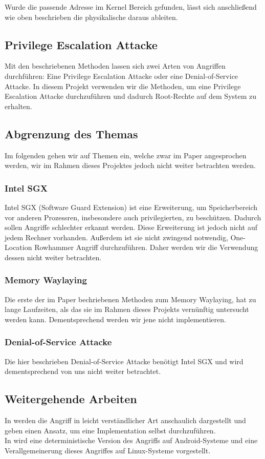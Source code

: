 \documentclass[conference]{IEEEtran}
\begin{document}
Wurde die passende Adresse im Kernel Bereich gefunden, lässt sich anschließend wie oben beschrieben die physikalische daraus ableiten. 



\subsection{Privilege Escalation Attacke}
Mit den beschriebenen Methoden lassen sich zwei Arten von Angriffen durchführen: Eine Privilege Escalation Attacke oder eine Denial-of-Service Attacke. In diesem Projekt verwenden wir die Methoden, um eine Privilege Escalation Attacke durchzuführen und dadurch Root-Rechte auf dem System zu erhalten.



\subsection{Abgrenzung des Themas}
Im folgenden gehen wir auf Themen ein, welche zwar im Paper angesprochen werden, wir im Rahmen dieses Projektes jedoch nicht weiter betrachten werden.
\subsubsection{Intel SGX}
Intel SGX (Software Guard Extension) ist eine Erweiterung, um Speicherbereich vor anderen Prozessren, insbesondere auch privilegierten, zu beschützen. Dadurch sollen Angriffe schlechter erkannt werden. Diese Erweiterung ist jedoch nicht auf jedem Rechner vorhanden. Außerdem ist sie nicht zwingend notwendig, One-Location Rowhammer Angriff durchzuführen. Daher werden wir die Verwendung dessen nicht weiter betrachten.
\subsubsection{Memory Waylaying}
Die erste der im Paper bechriebenen Methoden zum Memory Waylaying, hat zu lange Laufzeiten, als das sie im Rahmen dieses Projekts vernünftig untersucht werden kann. Dementsprechend werden wir jene nicht implementieren.
\subsubsection{Denial-of-Service Attacke}
Die hier beschrieben Denial-of-Service Attacke benötigt Intel SGX und wird dementsprechend von uns nicht weiter betrachtet.
\subsection{Weitergehende Arbeiten}
In \cite{seaborn2015} werden die Angriff in leicht verständlicher Art anschaulich dargestellt und geben einen Ansatz, um eine Implementation selbst durchzuführen.\\
In \cite{vanderVeen:2016:DDR:2976749.2978406} wird eine deterministische Version des Angriffs auf Android-Systeme und eine Verallgemeinerung dieses Angriffes auf Linux-Systeme vorgestellt.
\end{document}
